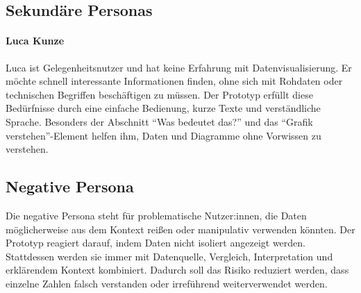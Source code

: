 \subsection{Sekund\"are Personas}

\paragraph{Luca Kunze}
Luca ist Gelegenheitsnutzer und hat keine Erfahrung mit Datenvisualisierung. Er m\"ochte schnell interessante Informationen finden, ohne sich mit Rohdaten oder technischen Begriffen besch\"aftigen zu m\"ussen. Der Prototyp erf\"ullt diese Bed\"urfnisse durch eine einfache Bedienung, kurze Texte und verst\"andliche Sprache. Besonders der Abschnitt ``Was bedeutet das?'' und das ``Grafik verstehen''-Element helfen ihm, Daten und Diagramme ohne Vorwissen zu verstehen.

\subsection{Negative Persona}

Die negative Persona steht f\"ur problematische Nutzer:innen, die Daten m\"oglicherweise aus dem Kontext rei\ss{}en oder manipulativ verwenden k\"onnten. Der Prototyp reagiert darauf, indem Daten nicht isoliert angezeigt werden. Stattdessen werden sie immer mit Datenquelle, Vergleich, Interpretation und erkl\"arendem Kontext kombiniert. Dadurch soll das Risiko reduziert werden, dass einzelne Zahlen falsch verstanden oder irref\"uhrend weiterverwendet werden.
